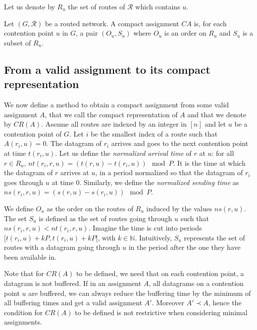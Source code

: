 \documentclass[english]{article}
\begin{document}
Let us denote by $R_u$ the set of routes of $\mathcal{R}$ which contains $u$.


\begin{definition}
Let $(G, \mathcal{R})$ be a routed network. A compact assignment $CA$ is, for each contention point $u$ in $G$, a pair $(O_u,S_u)$ where $O_u$ is an order on $R_u$ and $S_u$ is a subset of $R_u$.
\label{definition:compact}
\end{definition}


\subsection{From a valid assignment to its compact representation}

We now define a method to obtain a compact assignment from some valid assignment $A$, that we call the compact representation of $A$ and that we denote by $CR(A)$. Assume all routes are indexed by an integer in $[n]$ and let $u$ be a contention point of $G$. Let $i$ be the smallest index of a route such that $A(r_i,u) = 0$. The datagram of $r_i$ arrives and goes to the next contention point at time $t(r_i,u)$. Let us define the \emph{normalized arrival time} of $r$ at $u$: for all $r \in R_u$, $nt(r_i,r,u) = (t(r,u) - t(r_i,u)) \mod P$. It is the time at which the datagram of $r$ arrives at $u$, in a period normalized so that the datagram of $r_i$ goes through $u$ at time $0$. Similarly, we define the \emph{normalized sending time} as $ns(r_i,r,u) = (s(r,u) - s(r_i,u)) \mod P$.

We define $O_u$ as the order on the routes of $R_u$ induced by the values $ns(r,u)$. The set $S_u$ is defined as the set of routes going through $u$ such that $ns(r_i,r,u) < nt(r_i,r,u)$. Imagine the time is cut into periods $[t(r_i,u) + kP,t(r_i,u) + kP [$, with $k \in \mathbb{N}$. Intuitively, $S_u$ represents the set of routes with a datagram going through $u$ in the period after the one they have been available in.


Note that for $CR(A)$ to be defined, we need that on each contention point, a datagram is not buffered. If in an assignment $A$, all datagrams on a contention point $u$ are buffered, we can always reduce the buffering time by the minimum of all buffering times and get a valid assignment $A'$. Moreover $A' \prec A$, hence the condition for $CR(A)$ to be defined is not restrictive when considering minimal assignments.
\end{document}
